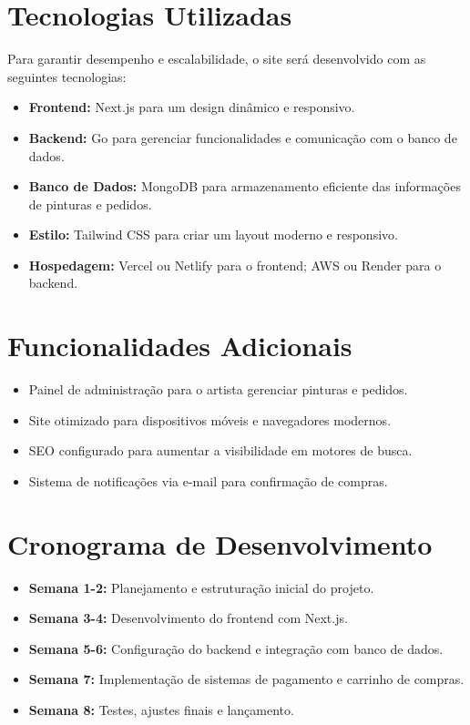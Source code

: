 \documentclass[a4paper,12pt]{article}
\begin{document}
\section*{Tecnologias Utilizadas}
Para garantir desempenho e escalabilidade, o site será desenvolvido com as seguintes tecnologias:
\begin{itemize}
    \item \textbf{Frontend:} Next.js para um design dinâmico e responsivo.
    \item \textbf{Backend:} Go para gerenciar funcionalidades e comunicação com o banco de dados.
    \item \textbf{Banco de Dados:} MongoDB para armazenamento eficiente das informações de pinturas e pedidos.
    \item \textbf{Estilo:} Tailwind CSS para criar um layout moderno e responsivo.
    \item \textbf{Hospedagem:} Vercel ou Netlify para o frontend; AWS ou Render para o backend.
\end{itemize}

\section*{Funcionalidades Adicionais}
\begin{itemize}
    \item Painel de administração para o artista gerenciar pinturas e pedidos.
    \item Site otimizado para dispositivos móveis e navegadores modernos.
    \item SEO configurado para aumentar a visibilidade em motores de busca.
    \item Sistema de notificações via e-mail para confirmação de compras.
\end{itemize}

\section*{Cronograma de Desenvolvimento}
\begin{itemize}
    \item \textbf{Semana 1-2:} Planejamento e estruturação inicial do projeto.
    \item \textbf{Semana 3-4:} Desenvolvimento do frontend com Next.js.
    \item \textbf{Semana 5-6:} Configuração do backend e integração com banco de dados.
    \item \textbf{Semana 7:} Implementação de sistemas de pagamento e carrinho de compras.
    \item \textbf{Semana 8:} Testes, ajustes finais e lançamento.
\end{itemize}
\end{document}
